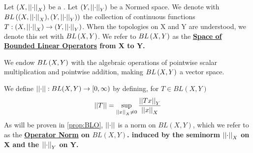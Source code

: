 \label{def:BLO} 
\newcommand{\SpaceOfBoundedLinearOperators}[0]{ 
    \bf \hyperref[def:BLO]{Space of Bounded Linear Operators} \rm
}
\newcommand{\OperatorNorm}[0]{
    \bf \hyperref[def:BLO]{Operator Norm} \rm
}
\begin{df}
Let $(X,\left|\left| \cdot \right|\right|_X)$ be a \SeminormedSpace. 
Let $(Y, \left|\left| \cdot \right|\right|_Y)$ be a Normed space.
We denote with $BL\left( (X,\left|\left| \cdot \right|\right|_X), (Y, \left|\left| \cdot \right|\right|_Y)\right)$ 
the collection of continuous functions
$T:(X, \left|\left| \cdot \right|\right|_X) \to (Y, \left|\left| \cdot \right|\right|_Y)$. 
When the topologies on X and Y are understood, we denote this set with
$BL\left( X,Y\right)$. 
We refer to $BL\left( X,Y\right)$ as the \SpaceOfBoundedLinearOperators from X to Y. 

We endow $BL\left( X,Y\right)$ with the algebraic operations
of pointwise scalar multiplication
and pointwise addition, making $BL\left( X,Y\right)$ a vector space. 

We define $\left|\left| \cdot \right|\right|:BL(X,Y) \to [0,\infty)$ by defining, 
for $T \in BL(X,Y)$
\begin{equation}
    \left|\left| T \right|\right| = \sup\limits_{\left|\left| x \right|\right|_X \neq 0} \frac{\left|\left| Tx \right|\right|_Y}{\left|\left| x \right|\right|_X}
\end{equation}
As will be proven in \ref{prop:BLO}, $\left|\left| \cdot \right|\right|$ is a norm on $BL(X,Y)$, which 
we refer to as the \OperatorNorm on $BL(X,Y)$. induced by the
seminorm $\left|\left| \cdot \right|\right|_X$ on X and the \Norm $\left|\left| \cdot \right|\right|_Y$ on Y. 
\end{df}
